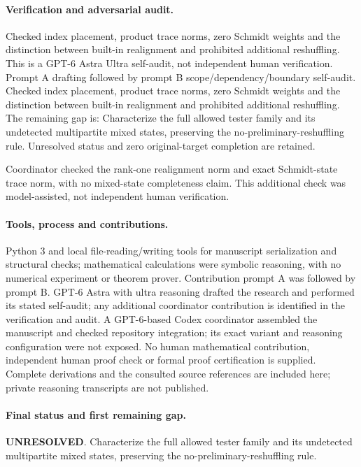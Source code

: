 \documentclass[11pt]{article}
\begin{document}
\paragraph{Verification and adversarial audit.}
Checked index placement, product trace norms, zero Schmidt weights and the distinction between built-in realignment and prohibited additional reshuffling. This is a GPT-6 Astra Ultra self-audit, not independent human verification. Prompt A drafting followed by prompt B scope/dependency/boundary self-audit. Checked index placement, product trace norms, zero Schmidt weights and the distinction between built-in realignment and prohibited additional reshuffling. The remaining gap is: Characterize the full allowed tester family and its undetected multipartite mixed states, preserving the no-preliminary-reshuffling rule. Unresolved status and zero original-target completion are retained.

Coordinator checked the rank-one realignment norm and exact Schmidt-state trace norm, with no mixed-state completeness claim. This additional check was model-assisted, not independent human verification.

\paragraph{Tools, process and contributions.}
Python 3 and local file-reading/writing tools for manuscript serialization and structural checks; mathematical calculations were symbolic reasoning, with no numerical experiment or theorem prover. Contribution prompt A was followed by prompt B. GPT-6 Astra with ultra reasoning drafted the research and performed its stated self-audit; any additional coordinator contribution is identified in the verification and audit. A GPT-6-based Codex coordinator assembled the manuscript and checked repository integration; its exact variant and reasoning configuration were not exposed. No human mathematical contribution, independent human proof check or formal proof certification is supplied. Complete derivations and the consulted source references are included here; private reasoning transcripts are not published.

\paragraph{Final status and first remaining gap.}
\textbf{UNRESOLVED}. Characterize the full allowed tester family and its undetected multipartite mixed states, preserving the no-preliminary-reshuffling rule.
\end{document}
